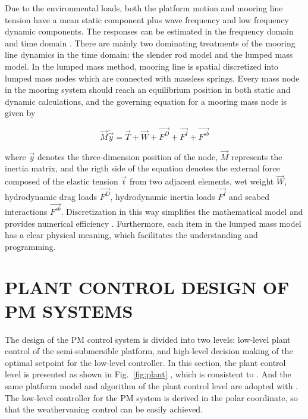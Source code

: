 \begin{sloppypar}
Due to the environmental loads, both the platform motion and mooring line tension have a mean static component plus wave frequency and low frequency dynamic components. The responses can be estimated in the frequency domain and time domain \cite{gao2009mooring}. There are mainly two dominating treatments of the mooring line dynamics in the time domain: the slender rod model and the lumped mass model. In the lumped mass method, mooring line is spatial discretized into lumped mass nodes which are connected with massless springs. Every mass node in the mooring system should reach an equilibrium position in both static and dynamic calculations, and the governing equation for a mooring mass node is given by 

\begin{equation}
	\vec{M}\ddot{\vec{y}} = \vec{T} + \vec{W} + \vec{F^D} + \vec{F^I} + \vec{F^{sb}}
\end{equation}

where $\vec{y}$ denotes the three-dimension position of the node, $\vec{M}$ represents the inertia matrix, and the rigth side of the equation denotes the external force composed of the elastic tension $\vec{t}$ from two adjacent elements, wet weight $\vec{W}$, hydrodynamic drag loads $\vec{F^D}$, hydrodynamic inertia loads $\vec{F^I}$ and seabed interactions $\vec{F^{sb}}$. Discretization in this way simplifies the mathematical model and provides numerical efficiency \cite{chai2002three, low2006time, xiong2016dynamics}. Furthermore, each item in the lumped mass model has a clear physical meaning, which facilitates the understanding and programming. 



\section{PLANT CONTROL DESIGN OF PM SYSTEMS}

The design of the PM control system is divided into two levels: low-level plant control of the semi-submersible platform, and high-level decision making of the optimal setpoint for the low-level controller. In this section, the plant control level is presented as shown in Fig.~\ref{fig:plant} , which is consistent to \cite{he2020energy}. And the same platform model and algorithm of the plant control level are adopted with \cite{he2020energy}. The low-level controller for the PM system is derived in the polar coordinate, so that the weathervaning control can be easily achieved. 


\end{sloppypar}
